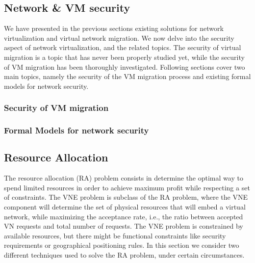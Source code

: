 \documentclass[a4paper, 11pt]{article}
\newcommand{\ie}{i.e.,\xspace}
\begin{document}














\subsection{Network \& VM security}

We have presented in the previous sections existing solutions for network virtualization and virtual network migration. We now delve into the security aspect of network virtualization, and the related topics. The security of virtual migration is a topic that has never been properly studied yet, while the security of VM migration has been thoroughly investigated. Following sections cover two main topics, namely the security of the VM migration process and existing formal models for network security.

\subsubsection{Security of VM migration}



\subsubsection{Formal Models for network security}



\subsection{Resource Allocation}
The resource allocation (RA) problem consists in determine the optimal way to spend limited resources in order to achieve maximum profit while respecting a set of constraints.
The VNE problem is subclass of the RA problem, where the VNE component will determine the set of physical resources that will embed a virtual network, while maximizing the acceptance rate, \ie the ratio between accepted VN requests and total number of requests.
The VNE problem is constrained by available resources, but there might be functional constraints like security requirements or geographical positioning rules.
In this section we consider two different techniques used to solve the RA problem, under certain circumstances. 
\end{document}
